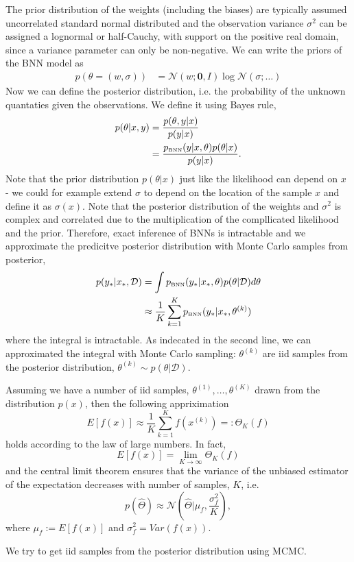 The prior distribution of the weights (including the biases) are typically assumed uncorrelated
standard normal distributed and the observation variance $\sigma^2$ can be assigned a lognormal or
half-Cauchy, with support on the positive real domain, since a variance parameter can only be
non-negative. We can write the priors of the BNN model as
\begin{align*}
    p(\theta = (w, \sigma)) &= \mathcal{N}(w;\textbf{0},I) \log\mathcal{N}(\sigma;\dots)
\end{align*}
Now we can define the posterior distribution, i.e. the probability of the unknown quantaties given
the observations. We define it using Bayes rule, 
\begin{align*}
    p(\theta|x,y) &= \frac{p(\theta,y|x)}{p(y|x)}\\
    &=\frac{p_{\text{\tiny BNN}}(y|x, \theta)p(\theta|x)}{p(y|x)}.
\end{align*}
Note that the prior distribution $p(\theta|x)$ just like the likelihood can depend on $x$ - we could
for example extend $\sigma$ to depend on the location of the sample $x$ and define it as
$\sigma(x)$. Note that the posterior distribution of the weights and $\sigma^2$ is
complex and correlated due to the multiplication of the compllicated likelihood and the prior. 
Therefore, exact inference of BNNs is intractable and we approximate the predicitve posterior distribution 
with Monte Carlo samples from posterior, 
\begin{align*}
    p(y_*|x_*,\mathcal{D}) &= \int p_{\text{\tiny BNN}}(y_*|x_*, \theta)p(\theta|\mathcal{D})d\theta\\
    &\approx \frac{1}{K} \sum_{k=1}^K p_{\text{\tiny BNN}}(y_*|x_*, \theta^{(k)})
\end{align*}
where the integral is intractable. As indecated in the second line, we can approximated the
integral with Monte Carlo sampling: $\theta^{(k)}$ are iid samples from the posterior distribution,
$\theta^{(k)} \sim p(\theta|\mathcal{D})$. 
\begin{testexample2}
    Assuming we have a number of iid samples, $\theta^{(1)}, \dots, \theta^{(K)}$ drawn from the
    distribution $p(x)$, then the following appriximation $$E[f(x)] \approx \frac{1}{K} \sum_{k=1}^K
    f(x^{(k)}) =: \Theta_{K}(f)$$ holds according to the law of large numbers. In fact,  $$E[f(x)] =
    \lim_{K \rightarrow \infty} \Theta_{K}(f)$$ and the central limit theorem ensures that the
    variance of the unbiased estimator of the expectation decreases with number of samples, $K$, i.e.
    $$p(\hat \Theta) \approx \mathcal{N}(\hat \Theta |\mu_f, \frac{\sigma_f^2}{K}),$$ where $\mu_f :=
    E[f(x)] $ and $\sigma_f^2 = Var(f(x))$. \cite{??}
\end{testexample2}
We try to get iid samples from the posterior distribution using MCMC.

